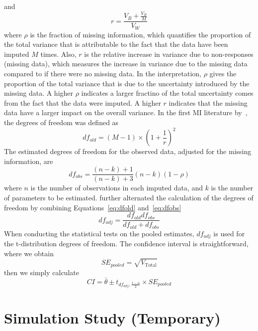 \documentclass[preprint,12pt]{elsarticle}
\begin{document}
and 
\begin{equation}
    r=\frac{V_B+\frac{V_B}{M}}{V_W}
\end{equation}
where $\rho$ is the fraction of missing information, which quantifies the proportion of the total variance that is attributable to the fact that the data have been imputed $M$ times. 
Also, $r$ is the relative increase in variance due to non-responses (missing data), which measures the increase in variance due to the missing data compared to if there were no missing data. 
In the interpretation, $\rho$ gives the proportion of the total variance that is due to the uncertainty introduced by the missing data. 
A higher $\rho$ indicates a larger fractino of the total uncertainty comes from the fact that the data were imputed.
A higher $r$ indicates that the missing data have a larger impact on the overall variance. 
In the first MI literature by~\citet{Rubin1987Multiple}, the degrees of freedom was defined as
\begin{equation}\label{eq:dfold}
    df_{old}=(M-1)\times (1+\frac{1}{r})^2
\end{equation}
The estimated degrees of freedom for the observed data, adjusted for the missing information, are
\begin{equation}\label{eq:dfobs}
    df_{obs}=\frac{(n-k)+1}{(n-k)+3}(n-k)(1-\rho)
\end{equation}
where $n$ is the number of observations in each imputed data, and $k$ is the number of parameters to be estimated.
\citet{barnard1999miscellanea} further alternated the calculation of the degrees of freedom by combining Equations~\ref{eq:dfold} and~\ref{eq:dfobs}
\begin{equation}
    df_{adj}=\frac{df_{old}df_{obs}}{df_{old}+df_{obs}}
\end{equation}
When conducting the statistical tests on the pooled estimates, $df_{adj}$ is used for the t-distribution degrees of freedom. 
The confidence interval is straightforward, where we obtain 
\begin{equation}
    SE_{pooled}=\sqrt{V_{\text{Total}}}
\end{equation}
then we simply calculate 
\begin{equation}
    CI=\bar{\theta}\pm t_{df_{adj},\frac{1-\alpha}{2}}\times SE_{pooled}
\end{equation}


\section{Simulation Study (Temporary)}
\end{document}
